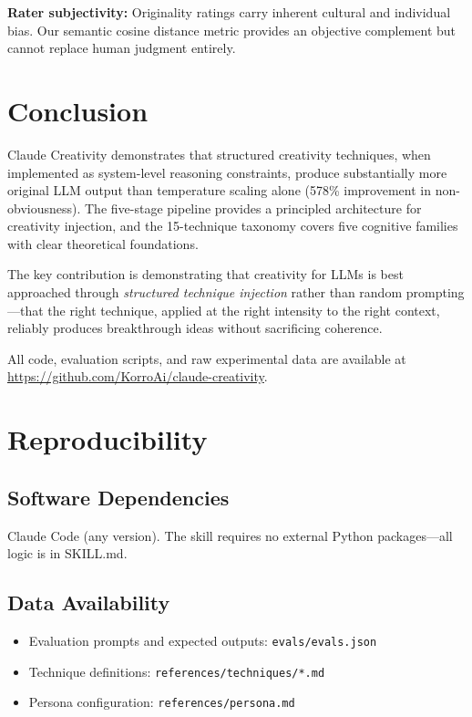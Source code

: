 \documentclass[11pt,a4paper]{article}
\begin{document}
\textbf{Rater subjectivity:} Originality ratings carry inherent cultural and individual bias. Our semantic cosine distance metric provides an objective complement but cannot replace human judgment entirely.

\section{Conclusion}

Claude Creativity demonstrates that structured creativity techniques, when implemented as system-level reasoning constraints, produce substantially more original LLM output than temperature scaling alone (578\% improvement in non-obviousness). The five-stage pipeline provides a principled architecture for creativity injection, and the 15-technique taxonomy covers five cognitive families with clear theoretical foundations.

The key contribution is demonstrating that creativity for LLMs is best approached through \textit{structured technique injection} rather than random prompting---that the right technique, applied at the right intensity to the right context, reliably produces breakthrough ideas without sacrificing coherence.

All code, evaluation scripts, and raw experimental data are available at \url{https://github.com/KorroAi/claude-creativity}.

\section*{Reproducibility}

\subsection*{Software Dependencies}
Claude Code (any version). The skill requires no external Python packages---all logic is in SKILL.md.

\subsection*{Data Availability}
\begin{itemize}
    \item Evaluation prompts and expected outputs: \texttt{evals/evals.json}
    \item Technique definitions: \texttt{references/techniques/*.md}
    \item Persona configuration: \texttt{references/persona.md}
\end{itemize}
\end{document}
